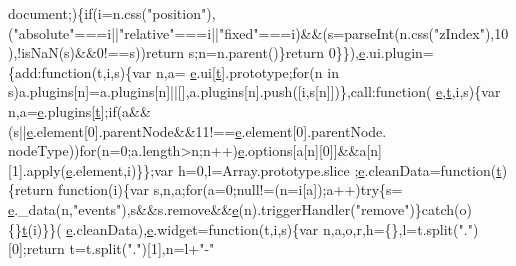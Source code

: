 \begin{DoxyCode}
      document;)\{\textcolor{keywordflow}{if}(i=n.css(\textcolor{stringliteral}{"position"}),(\textcolor{stringliteral}{"absolute"}===i||\textcolor{stringliteral}{"relative"}===i||\textcolor{stringliteral}{"fixed"}===i)&&(s=parseInt(n.css(\textcolor{stringliteral}{"zIndex"}),10
      ),!isNaN(s)&&0!==s))\textcolor{keywordflow}{return} s;n=n.parent()\}\textcolor{keywordflow}{return} 0\}\}),\hyperlink{jquery-ui_8min_8js_a2c038346d47955cbe2cb91e338edd7e1}{e}.ui.plugin=\{add:\textcolor{keyword}{function}(t,i,s)\{var n,a=
      \hyperlink{jquery-ui_8min_8js_a2c038346d47955cbe2cb91e338edd7e1}{e}.ui[\hyperlink{jquery-2_80_83_8min_8js_aaccc9105df5383111407fd5b41255e23}{t}].prototype;\textcolor{keywordflow}{for}(n in s)a.plugins[n]=a.plugins[n]||[],a.plugins[n].push([i,s[n]])\},call:\textcolor{keyword}{function}(
      \hyperlink{jquery-ui_8min_8js_a2c038346d47955cbe2cb91e338edd7e1}{e},\hyperlink{jquery-2_80_83_8min_8js_aaccc9105df5383111407fd5b41255e23}{t},i,s)\{var n,a=\hyperlink{jquery-ui_8min_8js_a2c038346d47955cbe2cb91e338edd7e1}{e}.plugins[\hyperlink{jquery-2_80_83_8min_8js_aaccc9105df5383111407fd5b41255e23}{t}];\textcolor{keywordflow}{if}(a&&(s||\hyperlink{jquery-ui_8min_8js_a2c038346d47955cbe2cb91e338edd7e1}{e}.element[0].parentNode&&11!==\hyperlink{jquery-ui_8min_8js_a2c038346d47955cbe2cb91e338edd7e1}{e}.element[0].parentNode.
      nodeType))\textcolor{keywordflow}{for}(n=0;a.length>n;n++)\hyperlink{jquery-ui_8min_8js_a2c038346d47955cbe2cb91e338edd7e1}{e}.options[a[n][0]]&&a[n][1].apply(\hyperlink{jquery-ui_8min_8js_a2c038346d47955cbe2cb91e338edd7e1}{e}.element,i)\}\};var h=0,l=Array.prototype.slice
      ;\hyperlink{jquery-ui_8min_8js_a2c038346d47955cbe2cb91e338edd7e1}{e}.cleanData=\textcolor{keyword}{function}(\hyperlink{jquery-2_80_83_8min_8js_aaccc9105df5383111407fd5b41255e23}{t})\{\textcolor{keywordflow}{return} \textcolor{keyword}{function}(i)\{var s,n,a;\textcolor{keywordflow}{for}(a=0;null!=(n=i[a]);a++)\textcolor{keywordflow}{try}\{s=
      \hyperlink{jquery-ui_8min_8js_a2c038346d47955cbe2cb91e338edd7e1}{e}.\_data(n,\textcolor{stringliteral}{"events"}),s&&s.remove&&\hyperlink{jquery-ui_8min_8js_a2c038346d47955cbe2cb91e338edd7e1}{e}(n).triggerHandler(\textcolor{stringliteral}{"remove"})\}\textcolor{keywordflow}{catch}(o)\{\}\hyperlink{jquery-2_80_83_8min_8js_aaccc9105df5383111407fd5b41255e23}{t}(i)\}\}(
      \hyperlink{jquery-ui_8min_8js_a2c038346d47955cbe2cb91e338edd7e1}{e}.cleanData),\hyperlink{jquery-ui_8min_8js_a2c038346d47955cbe2cb91e338edd7e1}{e}.widget=\textcolor{keyword}{function}(t,i,s)\{var n,a,o,r,h=\{\},l=t.split(\textcolor{stringliteral}{"."})[0];\textcolor{keywordflow}{return} t=t.split(\textcolor{stringliteral}{"."})[1],n=l+\textcolor{stringliteral}{"-"}

\end{DoxyCode}
